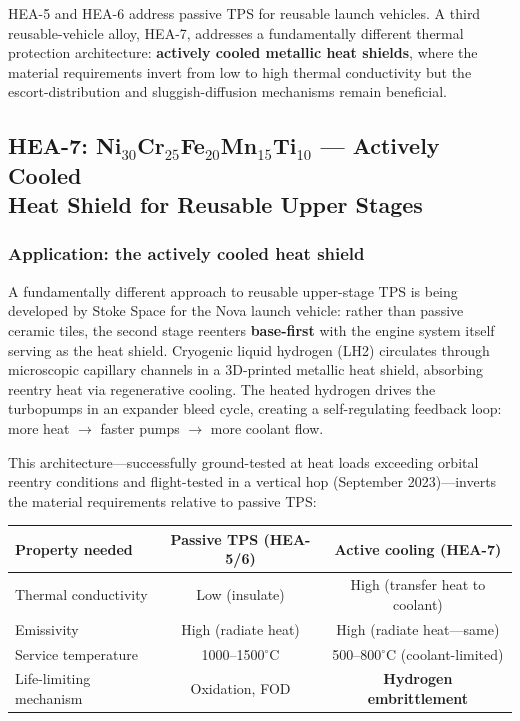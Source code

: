 \documentclass[12pt,letterpaper]{article}
\theoremstyle{definition}
\begin{document}
HEA-5 and HEA-6 address passive TPS for reusable launch vehicles.  A third reusable-vehicle alloy, HEA-7, addresses a fundamentally different thermal protection architecture: \textbf{actively cooled metallic heat shields}, where the material requirements invert from low to high thermal conductivity but the escort-distribution and sluggish-diffusion mechanisms remain beneficial.


\subsection[HEA-7: Actively Cooled Heat Shield Alloy]{HEA-7: Ni$_{30}$Cr$_{25}$Fe$_{20}$Mn$_{15}$Ti$_{10}$ --- Actively Cooled\\Heat Shield for Reusable Upper Stages}\label{sec:hea7}

\subsubsection{Application: the actively cooled heat shield}

A fundamentally different approach to reusable upper-stage TPS is being developed by Stoke Space for the Nova launch vehicle: rather than passive ceramic tiles, the second stage reenters \textbf{base-first} with the engine system itself serving as the heat shield.  Cryogenic liquid hydrogen (LH2) circulates through microscopic capillary channels in a 3D-printed metallic heat shield, absorbing reentry heat via regenerative cooling.  The heated hydrogen drives the turbopumps in an expander bleed cycle, creating a self-regulating feedback loop: more heat $\to$ faster pumps $\to$ more coolant flow.

This architecture---successfully ground-tested at heat loads exceeding orbital reentry conditions and flight-tested in a vertical hop (September 2023)---inverts the material requirements relative to passive TPS\@:

\begin{center}
\begin{tabular}{@{}lcc@{}}
\toprule
Property needed & Passive TPS (HEA-5/6) & Active cooling (HEA-7) \\
\midrule
Thermal conductivity & Low (insulate) & High (transfer heat to coolant) \\
Emissivity & High (radiate heat) & High (radiate heat---same) \\
Service temperature & 1000--1500$^\circ$C & 500--800$^\circ$C (coolant-limited) \\
Life-limiting mechanism & Oxidation, FOD & \textbf{Hydrogen embrittlement} \\
\bottomrule
\end{tabular}
\end{center}
\end{document}
